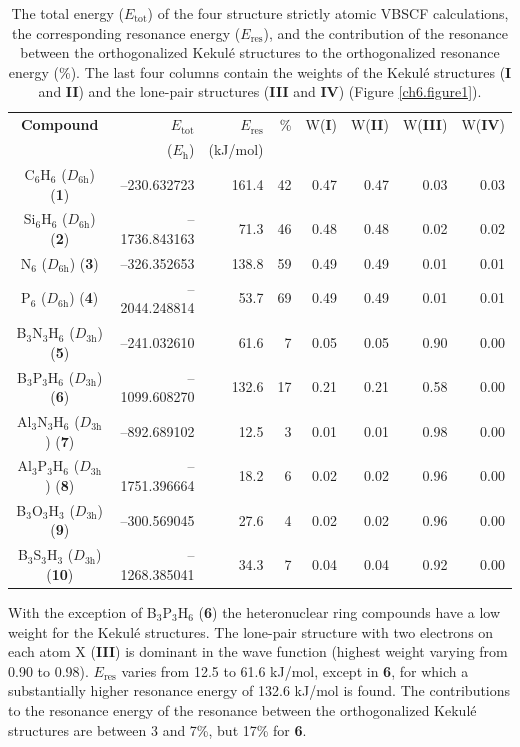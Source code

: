 \begin{table}[htdp]
\caption{The total energy ($E_\mathrm{tot}$) of the four structure strictly atomic VBSCF calculations,
the corresponding resonance energy ($E_\mathrm{res}$), and the contribution of the resonance between the orthogonalized Kekul\'e structures to the orthogonalized resonance energy (\%).
The last four columns contain the weights of the Kekul\'e structures (\textbf{I} and \textbf{II}) and
the lone-pair structures (\textbf{III} and \textbf{IV}) (Figure \ref{ch6.figure1}).}
\begin{center}
\begin{tabular}{ c r r r r r r r }
\hline
\textbf{Compound}&
$E_{\mathrm{tot}}$&
$E_{\mathrm{res}}$&
\%&
W(\textbf{I})&
W(\textbf{II})&
W(\textbf{III})&
W(\textbf{IV})\\
&($E_{\mathrm{h}}$)&(kJ/mol)&&&&&\\
\hline
C$_6$H$_6$ ($D_\mathrm{6h}$) (\textbf{1})&--230.632723&161.4&42&0.47&0.47&0.03&0.03\\
Si$_6$H$_6$ ($D_\mathrm{6h}$) (\textbf{2})&--1736.843163&71.3&46&0.48&0.48&0.02&0.02\\
N$_6$ ($D_\mathrm{6h}$) (\textbf{3})&--326.352653&138.8&59&0.49&0.49&0.01&0.01\\
P$_6$ ($D_\mathrm{6h}$) (\textbf{4})&--2044.248814&53.7&69&0.49&0.49&0.01&0.01\\
B$_3$N$_3$H$_6$ ($D_\mathrm{3h}$) (\textbf{5})&--241.032610&61.6&7&0.05&0.05&0.90&0.00\\
B$_3$P$_3$H$_6$ ($D_\mathrm{3h}$) (\textbf{6})&--1099.608270&132.6&17&0.21&0.21&0.58&0.00\\
Al$_3$N$_3$H$_6$ ($D_\mathrm{3h}$) (\textbf{7})&--892.689102&12.5&3&0.01&0.01&0.98&0.00\\
Al$_3$P$_3$H$_6$ ($D_\mathrm{3h}$) (\textbf{8})&--1751.396664&18.2&6&0.02&0.02&0.96&0.00\\
B$_3$O$_3$H$_3$ ($D_\mathrm{3h}$) (\textbf{9})&--300.569045&27.6&4&0.02&0.02&0.96&0.00\\
B$_3$S$_3$H$_3$ ($D_\mathrm{3h}$) (\textbf{10})&--1268.385041&34.3&7&0.04&0.04&0.92&0.00\\
\end{tabular}
\label{ch6.table2}
\end{center}
\end{table}

With the exception of B$_3$P$_3$H$_6$ (\textbf{6}) the heteronuclear ring compounds have a low
weight for the Kekul\'e structures. The lone-pair structure with two electrons
on each atom X (\textbf{III}) is dominant in the wave function (highest weight varying from 0.90 to 0.98).
$E_{\mathrm{res}}$ varies from 12.5 to 61.6 kJ/mol, except in \textbf{6}, for
which a substantially higher resonance energy of 132.6 kJ/mol is found. The contributions
to the resonance energy of the resonance between the orthogonalized
Kekul\'e structures are between 3 and 7\%, but 17\% for \textbf{6}.

